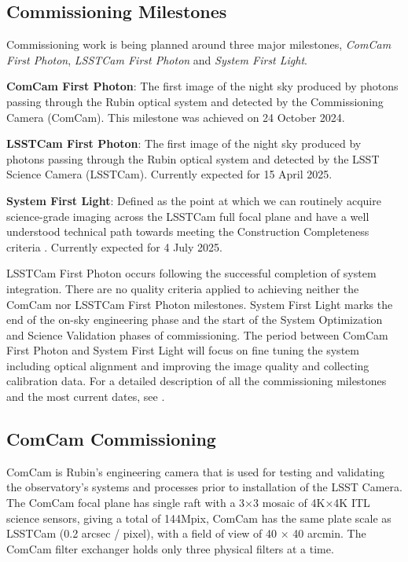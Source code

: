 \subsection{Commissioning Milestones}
\label{ssec:commissioning-milestones}

Commissioning work is being planned around three major milestones, \textit{ComCam First Photon}, \textit{LSSTCam First Photon} and \textit{System First Light}. 

\textbf{ComCam First Photon}: The first image of the night sky produced by photons passing through the Rubin optical system and detected by the Commissioning Camera (ComCam). 
This milestone was achieved on 24 October 2024. 

\textbf {LSSTCam First Photon}: The first image of the night sky produced by photons passing through the Rubin optical system and detected by the LSST Science Camera (LSSTCam).
Currently expected  for 15 April 2025.

\textbf {System First Light}: Defined as the point at which we can routinely acquire science-grade imaging across the LSSTCam full focal plane and have a well understood technical path towards meeting the Construction Completeness criteria   .
Currently expected for 4 July 2025. 

LSSTCam First Photon occurs following the successful completion of system integration. 
There are no quality criteria applied to achieving  neither the ComCam nor LSSTCam First Photon milestones. 
System First Light  marks the end of the  on-sky engineering phase and the start of the System Optimization and Science Validation phases of commissioning.
The period between ComCam First Photon and System First Light will focus on fine tuning the system including optical alignment and improving the image quality and collecting calibration data.
For a detailed description of all the commissioning milestones and the most current dates, see .

\subsection{ComCam Commissioning }
\label{ssec:commissioning-comcam}

ComCam is Rubin's engineering camera that is used for testing and validating the observatory's systems and processes prior to installation of the LSST Camera.
The ComCam focal plane has single raft with a 3×3 mosaic of 4K×4K ITL science sensors, giving a total of 144Mpix, 
ComCam has the same plate scale as LSSTCam (0.2 arcsec / pixel), with a field of view of 40 × 40 arcmin.
The ComCam filter exchanger holds only three physical filters at a time.

